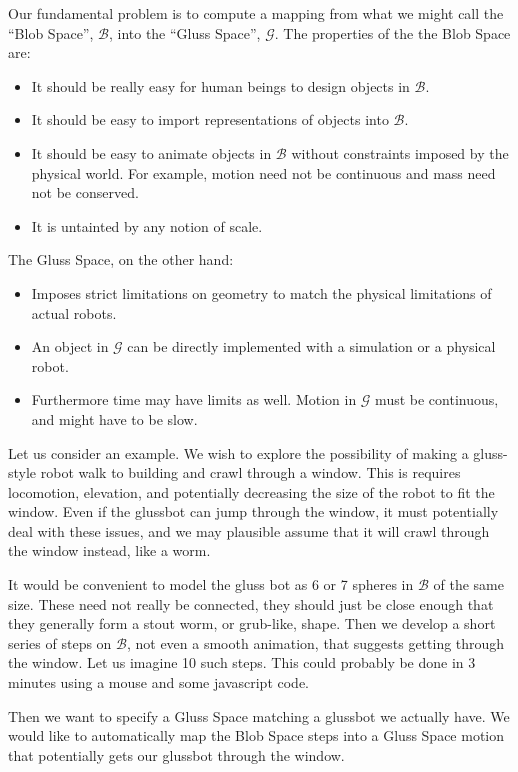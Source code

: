 \documentclass[11pt]{article}
\begin{document}
Our fundamental problem is to compute a mapping from what we might call the ``Blob Space'', $\mathcal{B}$, into
the ``Gluss Space'', $\mathcal{G}$. The properties of the the Blob Space are:
\begin{itemize}  
\item It should be really easy for human beings to design objects in $\mathcal{B}$.
\item It should be easy to import representations of objects into $\mathcal{B}$.
\item It should be easy to animate objects in $\mathcal{B}$ without constraints imposed by
  the physical world.  For example, motion need not be continuous and mass need not be conserved.
\item It is untainted by any notion of scale.
\end{itemize}  

The Gluss Space, on the other hand:
\begin{itemize}  
\item Imposes strict limitations on geometry to match the physical limitations of actual robots.
\item An object in $\mathcal{G}$ can be directly implemented with a simulation or a physical robot.
\item Furthermore time may have limits as well. Motion in $\mathcal{G}$ must be continuous, and
  might have to be slow.
\end{itemize}  

Let us consider an example.  We wish to explore the possibility of making a gluss-style robot
walk to  building and crawl through a window. This is requires locomotion, elevation, and
potentially decreasing the size of the robot to fit the window.  Even if the glussbot can
jump through the window, it must potentially deal with these issues, and we may plausible
assume that it will crawl through the window instead, like a worm.

It would be convenient to model the gluss bot as 6 or 7 spheres in $\mathcal{B}$ of the same size.
These need not really be connected, they should just be close enough that they generally form
a stout worm, or grub-like, shape.  Then we develop a short series of steps on $\mathcal{B}$, not
even a smooth animation, that suggests getting through the window. Let us imagine 10 such steps.
This could probably be done in 3 minutes using a mouse and some javascript code.

Then we want to specify a Gluss Space matching a glussbot we actually have. We would like
to automatically map the Blob Space steps into a Gluss Space motion that potentially gets our
glussbot through the window.
\end{document}
